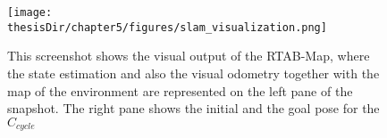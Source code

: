 \begin{figure}
  \centering
  \captionsetup{justification=centering}
  \texttt{[image: \\thesisDir/chapter5/figures/slam\_visualization.png]}
  \caption{This screenshot shows the visual output of the RTAB-Map, where the state estimation
  and also the visual odometry together with the map of the environment are 
  represented on the left pane of the snapshot. The right pane shows the initial
  and the goal pose for the $C_{cycle}$}
  \label{fig:slam_visualization}
\end{figure}


